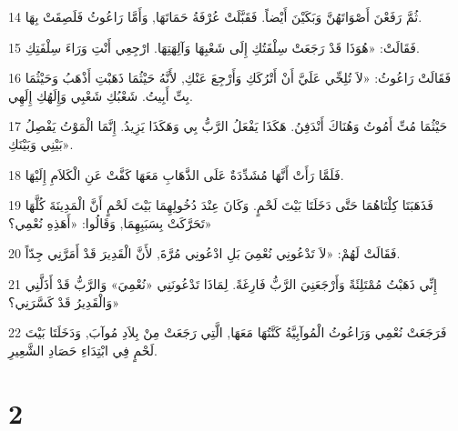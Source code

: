 \par 14 ثُمَّ رَفَعْنَ أَصْوَاتَهُنَّ وَبَكَيْنَ أَيْضاً. فَقَبَّلَتْ عُرْفَةُ حَمَاتَهَا, وَأَمَّا رَاعُوثُ فَلَصِقَتْ بِهَا.
\par 15 فَقَالَتْ: «هُوَذَا قَدْ رَجَعَتْ سِلْفَتُكِ إِلَى شَعْبِهَا وَآلِهَتِهَا. ارْجِعِي أَنْتِ وَرَاءَ سِلْفَتِكِ.
\par 16 فَقَالَتْ رَاعُوثُ: «لاَ تُلِحِّي عَلَيَّ أَنْ أَتْرُكَكِ وَأَرْجِعَ عَنْكِ, لأَنَّهُ حَيْثُمَا ذَهَبْتِ أَذْهَبُ وَحَيْثُمَا بِتِّ أَبِيتُ. شَعْبُكِ شَعْبِي وَإِلَهُكِ إِلَهِي.
\par 17 حَيْثُمَا مُتِّ أَمُوتُ وَهُنَاكَ أَنْدَفِنُ. هَكَذَا يَفْعَلُ الرَّبُّ بِي وَهَكَذَا يَزِيدُ. إِنَّمَا الْمَوْتُ يَفْصِلُ بَيْنِي وَبَيْنَكِ».
\par 18 فَلَمَّا رَأَتْ أَنَّهَا مُشَدِّدَةٌ عَلَى الذَّهَابِ مَعَهَا كَفَّتْ عَنِ الْكَلاَمِ إِلَيْهَا.
\par 19 فَذَهَبَتَا كِلْتَاهُمَا حَتَّى دَخَلَتَا بَيْتَ لَحْمٍ. وَكَانَ عِنْدَ دُخُولِهِمَا بَيْتَ لَحْمٍ أَنَّ الْمَدِينَةَ كُلَّهَا تَحَرَّكَتْ بِسَبَبِهِمَا, وَقَالُوا: «أَهَذِهِ نُعْمِي؟»
\par 20 فَقَالَتْ لَهُمْ: «لاَ تَدْعُونِي نُعْمِيَ بَلِ ادْعُونِي مُرَّةَ, لأَنَّ الْقَدِيرَ قَدْ أَمَرَّنِي جِدّاً.
\par 21 إِنِّي ذَهَبْتُ مُمْتَلِئَةً وَأَرْجَعَنِيَ الرَّبُّ فَارِغَةً. لِمَاذَا تَدْعُونَنِي «نُعْمِيَ» وَالرَّبُّ قَدْ أَذَلَّنِي وَالْقَدِيرُ قَدْ كَسَّرَنِي؟»
\par 22 فَرَجَعَتْ نُعْمِي وَرَاعُوثُ الْمُوآبِيَّةُ كَنَّتُهَا مَعَهَا, الَّتِي رَجَعَتْ مِنْ بِلاَدِ مُوآبَ, وَدَخَلَتَا بَيْتَ لَحْمٍ فِي ابْتِدَاءِ حَصَادِ الشَّعِيرِ.

\chapter{2}

